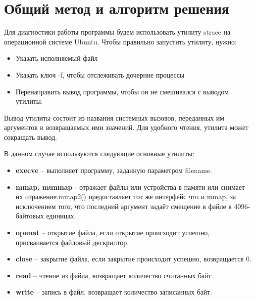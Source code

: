\section{Общий метод и алгоритм решения}

Для диагностики работы программы будем использовать утилиту strace на операционной системе Ubuntu.
Чтобы правильно запустить утилиту, нужно:

\begin{itemize}
    \item Указать исполняемый файл
    \item Указать ключ -f, чтобы отслеживать дочерние процессы
    \item Перенаправить вывод программы, чтобы он не смешивался с выводом утилиты.
\end{itemize}

Вывод утилиты состоит из названия системных вызовов, переданных им аргументов и возвращаемых ими значений. Для удобного чтения, утилита может сокращать вывод.

В данном случае используются следующие основные утилиты:

\begin{itemize}
    \item \textbf{execve} -- выполняет программу, заданную параметром filename.
    \item \textbf{mmap, munmap} - отражает файлы или устройства в памяти или снимает их отражение.mmap2() предоставляет тот же интерфейс что и mmap, за исключением того, что последний аргумент задаёт смещение в файле в 4096-байтовых единицах.
    \item \textbf{openat} -- открытие  файла, если открытие происходит успешно, присваивается файловый дескриптор.
    \item \textbf{close} -- закрытие файла, если закрытие происходит успешно, возвращается 0.
    \item \textbf{read} -- чтение из файла, возвращает количество считанных байт.
    \item \textbf{write} -- запись в файл, возвращает количество записанных байт.
\end{itemize}

\pagebreak
